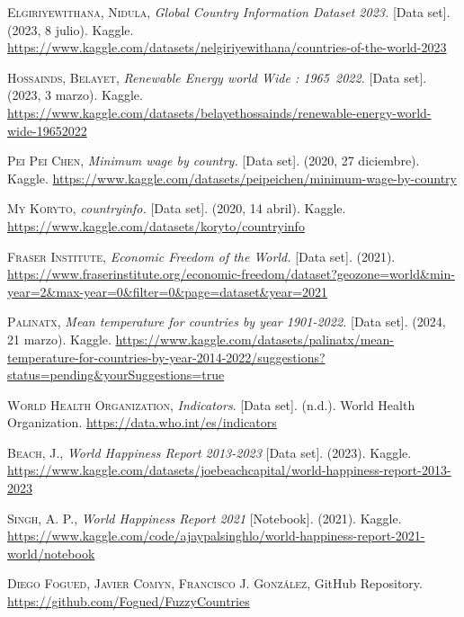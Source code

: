 \documentclass[fleqn,11pt]{article}
\begin{document}
\newpage
\begin{thebibliography}{10}
	
 \textsc{Elgiriyewithana, Nidula}, \textit{Global Country Information Dataset 2023.} [Data set]. (2023, 8 julio). Kaggle. \newline
\small{\url{https://www.kaggle.com/datasets/nelgiriyewithana/countries-of-the-world-2023}}

 \textsc{Hossainds, Belayet}, \textit{Renewable Energy world Wide : 1965~2022.} [Data set]. (2023, 3 marzo). Kaggle. \newline
\small{\url{https://www.kaggle.com/datasets/belayethossainds/renewable-energy-world-wide-19652022}}

 \textsc{Pei Pei Chen}, \textit{Minimum wage by country.} [Data set]. (2020, 27 diciembre). Kaggle. \newline
\small{\url{https://www.kaggle.com/datasets/peipeichen/minimum-wage-by-country}}

 \textsc{My Koryto}, \textit{countryinfo.} [Data set]. (2020, 14 abril). Kaggle. \newline
\small{\url{https://www.kaggle.com/datasets/koryto/countryinfo}}

 \textsc{Fraser Institute}, \textit{Economic Freedom of the World.} [Data set]. (2021). \newline
\small{\url{https://www.fraserinstitute.org/economic-freedom/dataset?geozone=world&min-year=2&max-year=0&filter=0&page=dataset&year=2021}}

 \textsc{Palinatx}, \textit{Mean temperature for countries by year 1901-2022.} [Data set]. (2024, 21 marzo). Kaggle. \newline
\small{\url{https://www.kaggle.com/datasets/palinatx/mean-temperature-for-countries-by-year-2014-2022/suggestions?status=pending&yourSuggestions=true}}

 \textsc{World Health Organization}, \textit{Indicators}. [Data set]. (n.d.). World Health Organization. \newline
\small{\url{https://data.who.int/es/indicators}}

 \textsc{Beach, J.}, \textit{World Happiness Report 2013-2023} [Data set]. (2023). Kaggle. \newline
\small{\url{https://www.kaggle.com/datasets/joebeachcapital/world-happiness-report-2013-2023}}

 \textsc{Singh, A. P.}, \textit{World Happiness Report 2021} [Notebook]. (2021). Kaggle. \newline
\small{\url{https://www.kaggle.com/code/ajaypalsinghlo/world-happiness-report-2021-world/notebook}}

 \textsc{Diego Fogued, Javier Comyn, Francisco J. González}, GitHub Repository. \newline
\small{\url{https://github.com/Fogued/FuzzyCountries}}

\end{thebibliography}
\end{document}
